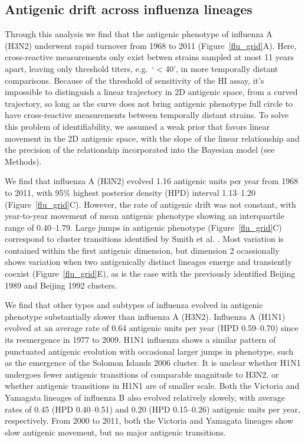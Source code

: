 \documentclass[11pt,oneside,letterpaper]{article}
\begin{document}
\subsection*{Antigenic drift across influenza lineages}


Through this analysis we find that the antigenic phenotype of influenza A (H3N2) underwent rapid turnover from 1968 to 2011 (Figure~\ref{flu_grid}A).  
Here, cross-reactive measurements only exist betwen strains sampled at most 11 years apart, leaving only threshold titers, e.g.\ `$<$40', in more temporally distant comparisons.  
Because of the threshold of sensitivity of the HI assay, it's impossible to distinguish a linear trajectory in 2D antigenic space, from a curved trajectory, so long as the curve does not bring antigenic phenotype full circle to have cross-reactive measurements between temporally distant strains.
To solve this problem of identifiability, we assumed a weak prior that favors linear movement in the 2D antigenic space, with the slope of the linear relationship and the precision of the relationship incorporated into the Bayesian model (see Methods).

We find that influenza A (H3N2) evolved 1.16 antigenic units per year from 1968 to 2011, with 95\% highest posterior density (HPD) interval 1.13--1.20 (Figure~\ref{flu_grid}C).
However, the rate of antigenic drift was not constant, with year-to-year movement of mean antigenic phenotype showing an interquartile range of 0.40--1.79.  
Large jumps in antigenic phenotype (Figure~\ref{flu_grid}C) correspond to cluster transitions identified by Smith et al. \cite{Smith04}.  
Most variation is contained within the first antigenic dimension, but dimension 2 ocassionally shows variation when two antigenically distinct lineages emerge and transiently coexist (Figure~\ref{flu_grid}E), as is the case with the previously identified Beijing 1989 and Beijing 1992 clusters.

We find that other types and subtypes of influenza evolved in antigenic phenotype substantially slower than influenza A (H3N2).
Influenza A (H1N1) evolved at an average rate of 0.64 antigenic units per year (HPD 0.59--0.70) since its reemergence in 1977 to 2009.  
H1N1 influenza shows a similar pattern of punctuated antigenic evolution with occasional larger jumps in phenotype, such as the emergence of the Solomon Islands 2006 cluster.  
It is unclear whether H1N1 undergoes fewer antigenic transitions of comparable magnitude to H3N2, or whether antigenic transitions in H1N1 are of smaller scale.  
Both the Victoria and Yamagata lineages of influenza B also evolved relatively slowely, with average rates of 0.45 (HPD 0.40--0.51) and 0.20 (HPD 0.15--0.26) antigenic units per year, respectively.  
From 2000 to 2011, both the Victoria and Yamagata lineages show slow antigenic movement, but no major antigenic transitions.
\end{document}
